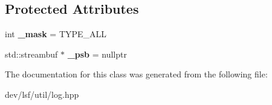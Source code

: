 \subsection*{Protected Attributes}
\begin{DoxyCompactItemize}
\item 
\hypertarget{classlsf_1_1util_1_1Log_a59fecf58f1e4a08845550bff3bb88dea}{
int {\bfseries \_\-mask} = TYPE\_\-ALL}
\label{classlsf_1_1util_1_1Log_a59fecf58f1e4a08845550bff3bb88dea}

\item 
\hypertarget{classlsf_1_1util_1_1Log_a75fb6bddf70527dcfab5a46786ae8a4e}{
std::streambuf $\ast$ {\bfseries \_\-psb} = nullptr}
\label{classlsf_1_1util_1_1Log_a75fb6bddf70527dcfab5a46786ae8a4e}

\end{DoxyCompactItemize}


The documentation for this class was generated from the following file:\begin{DoxyCompactItemize}
\item 
dev/lsf/util/log.hpp\end{DoxyCompactItemize}
